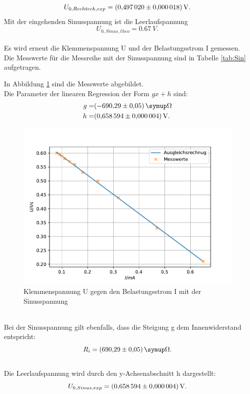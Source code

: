 \begin{equation*}
  U_{0, Rechteck, exp}=\SI{0.497020 \pm 0.000018}{V}.
\end{equation*}
Mit der eingehenden Sinusspannung ist die Leerlaufspannung
\begin{equation*}
  U_{0, Sinus, theo}=\SI{0.67}{V}.
\end{equation*}
\\Es wird erneut die Klemmenspannung U und der Belastungsstrom I gemessen.
Die Messwerte für die Messreihe mit der Sinusspannung sind in Tabelle \ref{tab:Sin} aufgetragen.

In Abbildung \ref{fig:Sin} sind die Messwerte abgebildet.
\\Die Parameter der linearen Regression der Form $gx+h$ sind:
\begin{align*}
g=& \SI{-690.29 \pm 0.05}{\symup\Omega}\\
h=& \SI{0.658594 \pm 0.000004}{V}.\\
\end{align*}
\begin{figure}[h!]
  \centering
  \includegraphics[width=\textwidth]{Sin.pdf}
  \caption{Klemmenspannung U gegen den Belastungsstrom I mit der Sinusspannung}
  \label{fig:Sin}
\end{figure}
\\Bei der Sinusspannung gilt ebenfalls, dass die Steigung g dem Innenwiderstand entspricht:
\begin{equation*}
  R_{i}=\SI{690.29 \pm 0.05}{\symup\Omega}.
\end{equation*}
\\Die Leerlaufspannung wird durch den y-Achsenabschnitt h dargestellt:
\begin{equation*}
  U_{0, Sinus, exp}=\SI{0.658594 \pm 0.000004}{V}.
\end{equation*}
\FloatBarrier

